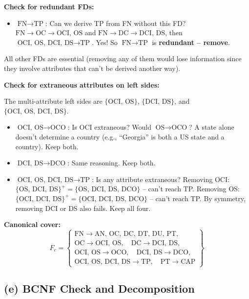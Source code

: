 \documentclass[11pt]{article}
\begin{document}
\noindent\textbf{Check for redundant FDs:}

\begin{itemize}
  \item $\text{FN} \to \text{TP}$: Can we derive TP from FN without this FD? $\text{FN} \to \text{OC} \to \text{OCI, OS}$ and $\text{FN} \to \text{DC} \to \text{DCI, DS}$, then $\text{OCI, OS, DCI, DS} \to \text{TP}$. Yes! So $\text{FN} \to \text{TP}$ is \textbf{redundant -- remove}.
\end{itemize}

All other FDs are essential (removing any of them would lose information since they involve attributes that can't be derived another way).

\medskip
\noindent\textbf{Check for extraneous attributes on left sides:}

The multi-attribute left sides are $\{\text{OCI, OS}\}$, $\{\text{DCI, DS}\}$, and $\{\text{OCI, OS, DCI, DS}\}$.

\begin{itemize}
  \item $\text{OCI, OS} \to \text{OCO}$: Is OCI extraneous? Would $\text{OS} \to \text{OCO}$? A state alone doesn't determine a country (e.g., ``Georgia'' is both a US state and a country). Keep both.
  \item $\text{DCI, DS} \to \text{DCO}$: Same reasoning. Keep both.
  \item $\text{OCI, OS, DCI, DS} \to \text{TP}$: Is any attribute extraneous? Removing OCI: $\{\text{OS, DCI, DS}\}^+ = \{\text{OS, DCI, DS, DCO}\}$ -- can't reach TP. Removing OS: $\{\text{OCI, DCI, DS}\}^+ = \{\text{OCI, DCI, DS, DCO}\}$ -- can't reach TP. By symmetry, removing DCI or DS also fails. Keep all four.
\end{itemize}

\medskip
\noindent\textbf{Canonical cover:}
\[
\boxed{F_c = \left\{\begin{array}{l}
\text{FN} \to \text{AN, OC, DC, DT, DU, PT}, \\
\text{OC} \to \text{OCI, OS},\quad \text{DC} \to \text{DCI, DS}, \\
\text{OCI, OS} \to \text{OCO},\quad \text{DCI, DS} \to \text{DCO}, \\
\text{OCI, OS, DCI, DS} \to \text{TP},\quad \text{PT} \to \text{CAP}
\end{array}\right\}}
\]

\subsection{(e) BCNF Check and Decomposition}
\end{document}

